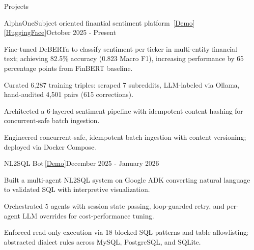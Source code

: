 \documentclass[
	10pt, %
]{resume} %
\begin{document}
\begin{rSection}{Projects}

	\begin{rProject}{AlphaOne}{Subject oriented finantial sentiment platform {\small{}\,[\href{https://artysicistz.github.io/projects/alphaone-demo.html}{Demo}]\,[\href{https://huggingface.co/ArtysicistZ/deberta-absa-v2}{HuggingFace}]}}{October 2025 - Present}
		\item Fine-tuned DeBERTa to classify sentiment per ticker in multi-entity financial text; achieving 82.5\% accuracy (0.823 Macro F1), increasing performance by 65 percentage points from FinBERT baseline.
		\item Curated 6,287 training triples: scraped 7 subreddits, LLM-labeled via Ollama, hand-audited 4,501 pairs (615 corrections).
		\item Architected a 6-layered sentiment pipeline with idempotent content hashing for concurrent-safe batch ingestion.
		\item Engineered concurrent-safe, idempotent batch ingestion with content versioning; deployed via Docker Compose.
	\end{rProject}


	\begin{rProject}{NL2SQL Bot}{{\small{}\,[\href{https://artysicistz.github.io/projects/nl2sql.html}{Demo}]}}{December 2025 - January 2026}
		\item Built a multi-agent NL2SQL system on Google ADK converting natural language to validated SQL with interpretive visualization.
		\item Orchestrated 5 agents with session state passing, loop-guarded retry, and per-agent LLM overrides for cost-performance tuning.
		\item Enforced read-only execution via 18 blocked SQL patterns and table allowlisting; abstracted dialect rules across MySQL, PostgreSQL, and SQLite.
	\end{rProject}

\end{rSection}

\end{document}
